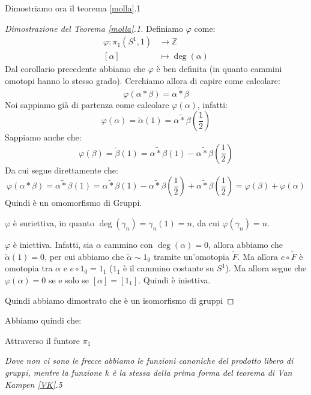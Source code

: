 \documentclass[11pt,a4paper,twoside]{article}
\theoremstyle{definition}
\begin{document}
Dimostriamo ora il teorema \ref{molla}.1

\begin{proof}[Dimostrazione del Teorema \ref{molla}.1]
	Definiamo $\varphi$ come:
	\begin{align*}
		\varphi: \pi_1(S^1,1) & \to \mathbb Z\\
		[\alpha] & \mapsto \deg(\alpha)
	\end{align*}
	Dal corollario precedente abbiamo che $\varphi$ è ben definita (in quanto cammini omotopi hanno lo stesso grado). Cerchiamo allora di capire come calcolare:
	\[ \varphi(\alpha * \beta) = \widetilde{\alpha*\beta} \]
	Noi sappiamo già di partenza come calcolare $\varphi(\alpha)$, infatti:
	\[ \varphi(\alpha) = \tilde\alpha(1) = \widetilde{\alpha*\beta}\left(\frac 12\right)\]
	Sappiamo anche che:
	\[ \varphi(\beta) = \tilde \beta(1) = \widetilde{\alpha*\beta}(1) - \widetilde{\alpha*\beta}\left(\frac 12\right) \]
	Da cui segue direttamente che:
	\[ \varphi(\alpha*\beta) = \widetilde{\alpha*\beta}(1) = \widetilde{\alpha*\beta}(1) - \widetilde{\alpha*\beta}\left(\frac 12\right) + \widetilde{\alpha*\beta}\left(\frac 12\right) = \varphi(\beta) + \varphi(\alpha)\]
	Quindi è un omomorfismo di Gruppi.

	$\varphi$ è suriettiva, in quanto $\deg(\gamma_n) = \gamma_n(1) = n$, da cui $\varphi(\gamma_n) = n$.

	$\varphi$ è iniettiva. Infatti, sia $\alpha$ cammino con $\deg(\alpha) = 0$, allora abbiamo che $\tilde \alpha(1) = 0$, per cui abbiamo che $\tilde \alpha \sim 1_0$ tramite un'omotopia $\tilde F$. Ma allora $e \circ \tilde F$ è omotopia tra $\alpha$ e $e \circ 1_0 = 1_1$ ($1_1$ è il cammino costante su $S^1$). Ma allora segue che $\varphi(\alpha) = 0$ se e solo se $[\alpha] = [1_1]$. Quindi è iniettiva.

	Quindi abbiamo dimostrato che è un isomorfismo di gruppi
\end{proof}

Abbiamo quindi che:
\begin{center}
\end{center}
Attraverso il funtore $\pi_1$
\begin{center}
\end{center}
\textit{Dove non ci sono le frecce abbiamo le funzioni canoniche del prodotto libero di gruppi, mentre la funzione $k$ è la stessa della prima forma del teorema di Van Kampen \ref{VK}.5}
\end{document}
